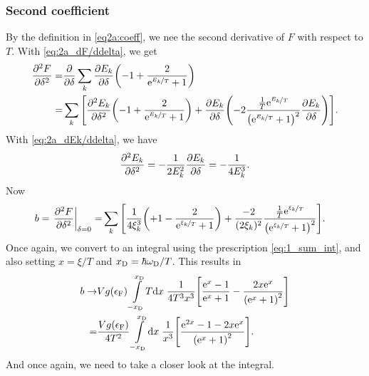 \documentclass[11pt,letter, swedish, english
]{article}
\newcommand{\Tc}{\ensuremath{T_{\text{c}}}}
\newcommand{\eF}{\ensuremath{\epsilon_{\text{F}}}}
\newcommand{\wD}{\ensuremath{\omega_{\text{D}}}}
\begin{document}


\subsubsection{Second coefficient}
By the definition in \eqref{eq2a:coeff}, we nee the second derivative
of $F$ with respect to $T$. With \eqref{eq:2a_dF/ddelta}, we get
\begin{equation}
\begin{aligned}
\pdv[2]{F}{\delta}=&\pdv{\delta}\sum_k\pdv{E_k}{\delta}
\qty(-1 + \frac{2}{\mathrm{e}^{\nicefrac{E_k}{T}}+1})\\
=&\sum_k\qty[\pdv[2]{E_k}{\delta}
\qty(-1 + \frac{2}{\mathrm{e}^{\nicefrac{E_k}{T}}+1})
+\pdv{E_k}{\delta}\qty(
-2\frac{\frac{1}{T}\mathrm{e}^{\nicefrac{E_k}{T}}}{\qty(\mathrm{e}^{\nicefrac{E_k}{T}}+1)^2}
\pdv{E_k}{\delta})
].
\end{aligned}
\end{equation}
With \eqref{eq:2a_dEk/ddelta}, we have
\begin{equation}
\pdv[2]{E_k}{\delta}=-\frac{1}{2E_k^2}\pdv{E_k}{\delta}=-\frac{1}{4E_k^3}.
\end{equation}
Now
\begin{equation}
\begin{aligned}
b=\eval{\pdv[2]{F}{\delta}}_{\delta=0}
=&\sum_k\qty[
\frac{1}{4\xi_k^3}
\qty(+1 - \frac{2}{\ee^{\nicefrac{\xi_k}{T}}+1})
+\frac{-2}{(2\xi_k)^2}
\frac{\frac{1}{T}\ee^{\nicefrac{\xi_k}{T}}}{\qty(\ee^{\nicefrac{\xi_k}{T}}+1)^2}
].
\end{aligned}
\end{equation}
Once again, we convert to an integral using the prescription
\eqref{eq:1_sum_int}, and also setting $x=\xi/T$ and
$\xD=\hbar\wD/T$. This results in 
\begin{equation}
\begin{aligned}
b\to& Vg(\eF)\int_{-\xD}^{\xD}\!T\rd{x}\;
 \frac{1}{4T^3x^3}\qty[
\frac{\ee^{x}-1}{\ee^{x}+1}
-\frac{2x\ee^{x}}{\qty(\ee^{x}+1)^2}
]\\
=&\frac{Vg(\eF)}{4T^2}\int_{-\xD}^{\xD}\!\rd{x}\;
\frac{1}{x^3}
\qty[
\frac{\ee^{2x}-1-2x\ee^{x}}{\qty(\ee^{x}+1)^2}
].\\
\end{aligned}
\end{equation}
And once again, we need to take a closer look at the integral.
\end{document}
